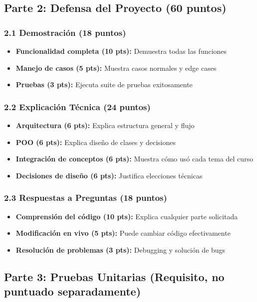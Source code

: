 \documentclass[12pt,a4paper]{article}
\begin{document}
\subsection{Parte 2: Defensa del Proyecto (60 puntos)}

\subsubsection{2.1 Demostración (18 puntos)}
\begin{itemize}[leftmargin=*]
    \item \textbf{Funcionalidad completa (10 pts):} Demuestra todas las funciones
    \item \textbf{Manejo de casos (5 pts):} Muestra casos normales y edge cases
    \item \textbf{Pruebas (3 pts):} Ejecuta suite de pruebas exitosamente
\end{itemize}

\subsubsection{2.2 Explicación Técnica (24 puntos)}
\begin{itemize}[leftmargin=*]
    \item \textbf{Arquitectura (6 pts):} Explica estructura general y flujo
    \item \textbf{POO (6 pts):} Explica diseño de clases y decisiones
    \item \textbf{Integración de conceptos (6 pts):} Muestra cómo usó cada tema del curso
    \item \textbf{Decisiones de diseño (6 pts):} Justifica elecciones técnicas
\end{itemize}

\subsubsection{2.3 Respuestas a Preguntas (18 puntos)}
\begin{itemize}[leftmargin=*]
    \item \textbf{Comprensión del código (10 pts):} Explica cualquier parte solicitada
    \item \textbf{Modificación en vivo (5 pts):} Puede cambiar código efectivamente
    \item \textbf{Resolución de problemas (3 pts):} Debugging y solución de bugs
\end{itemize}

\subsection{Parte 3: Pruebas Unitarias (Requisito, no puntuado separadamente)}
\end{document}
